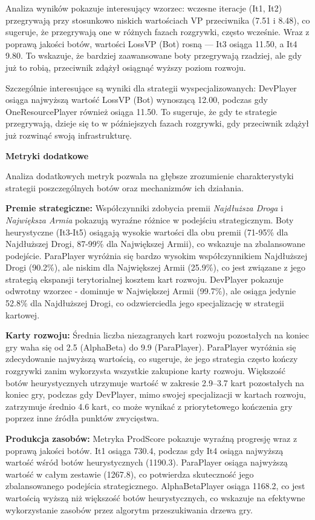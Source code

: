 \documentclass[polish,inz,longabstract]{iithesis}
\begin{document}
Analiza wyników pokazuje interesujący wzorzec: wczesne iteracje (It1, It2) przegrywają przy stosunkowo niskich wartościach VP przeciwnika (7.51 i 8.48), co sugeruje, że przegrywają one w różnych fazach rozgrywki, często wcześnie. Wraz z poprawą jakości botów, wartości LossVP (Bot) rosną --- It3 osiąga 11.50, a It4 9.80. To wskazuje, że bardziej zaawansowane boty przegrywają rzadziej, ale gdy już to robią, przeciwnik zdążył osiągnąć wyższy poziom rozwoju.

Szczególnie interesujące są wyniki dla strategii wyspecjalizowanych: DevPlayer osiąga najwyższą wartość LossVP (Bot) wynoszącą 12.00, podczas gdy OneResourcePlayer również osiąga 11.50. To sugeruje, że gdy te strategie przegrywają, dzieje się to w późniejszych fazach rozgrywki, gdy przeciwnik zdążył już rozwinąć swoją infrastrukturę.

\textbf{Metryki dodatkowe}

Analiza dodatkowych metryk pozwala na głębsze zrozumienie charakterystyki strategii poszczególnych botów oraz mechanizmów ich działania.

\textbf{Premie strategiczne:} Współczynniki zdobycia premii \textit{Najdłuższa Droga} i \textit{Największa Armia} pokazują wyraźne różnice w podejściu strategicznym. Boty heurystyczne (It3-It5) osiągają wysokie wartości dla obu premii (71-95\% dla Najdłuższej Drogi, 87-99\% dla Największej Armii), co wskazuje na zbalansowane podejście. ParaPlayer wyróżnia się bardzo wysokim współczynnikiem Najdłuższej Drogi (90.2\%), ale niskim dla Największej Armii (25.9\%), co jest związane z jego strategią ekspansji terytorialnej kosztem kart rozwoju. DevPlayer pokazuje odwrotny wzorzec - dominuje w Największej Armii (99.7\%), ale osiąga jedynie 52.8\% dla Najdłuższej Drogi, co odzwierciedla jego specjalizację w strategii kartowej.

\textbf{Karty rozwoju:} Średnia liczba niezagranych kart rozwoju pozostałych na koniec gry waha się od 2.5 (AlphaBeta) do 9.9 (ParaPlayer). ParaPlayer wyróżnia się zdecydowanie najwyższą wartością, co sugeruje, że jego strategia często kończy rozgrywki zanim wykorzysta wszystkie zakupione karty rozwoju. Większość botów heurystycznych utrzymuje wartość w zakresie 2.9–3.7 kart pozostałych na koniec gry, podczas gdy DevPlayer, mimo swojej specjalizacji w kartach rozwoju, zatrzymuje średnio 4.6 kart, co może wynikać z priorytetowego kończenia gry poprzez inne źródła punktów zwycięstwa.

\textbf{Produkcja zasobów:} Metryka ProdScore pokazuje wyraźną progresję wraz z poprawą jakości botów. It1 osiąga 730.4, podczas gdy It4 osiąga najwyższą wartość wśród botów heurystycznych (1190.3). ParaPlayer osiąga najwyższą wartość w całym zestawie (1267.8), co potwierdza skuteczność jego zbalansowanego podejścia strategicznego. AlphaBetaPlayer osiąga 1168.2, co jest wartością wyższą niż większość botów heurystycznych, co wskazuje na efektywne wykorzystanie zasobów przez algorytm przeszukiwania drzewa gry.
\end{document}
